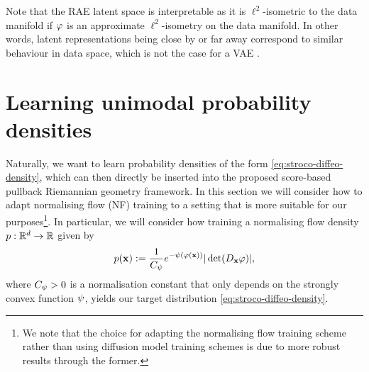 \begin{remark}
\label{rem:interpretability-rae}
    Note that the RAE latent space is interpretable as it is $\ell^2$-isometric to the data manifold if $\varphi$ is an approximate $\ell^2$-isometry on the data manifold. In other words, latent representations being close by or far away correspond to similar behaviour in data space, which is not the case for a VAE \cite{kingma2013auto}.
\end{remark}

\section{Learning unimodal probability densities }
\label{sec:adapting-normalising-flows}

Naturally, we want to learn probability densities of the form \ref{eq:stroco-diffeo-density}, which can then directly be inserted into the proposed score-based pullback Riemannian geometry framework. In this section we will consider how to adapt normalising flow (NF) \cite{dinh2017density} training to a setting that is more suitable for our purposes\footnote{We note that the choice for adapting the normalising flow training scheme rather than using diffusion model training schemes is due to more robust results through the former.}. In particular, we will consider how training a normalising flow density $p: \mathbb{R}^d\to\mathbb{R}$ given by 
\begin{equation}
    p(\mathbf{x}):= \frac{1}{C_{\psi}}e^{- \psi(\varphi(\mathbf{x}))} |\det(D_{\mathbf{x}} \varphi)|,
    \label{eq:nf-density}
\end{equation}
where $C_{\psi}>0$ is a normalisation constant that only depends on the strongly convex function $\psi$, yields our target distribution \ref{eq:stroco-diffeo-density}.

